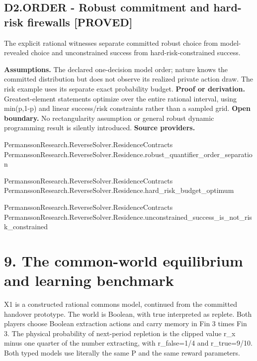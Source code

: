 \documentclass[11pt,a4paper]{article}
\begin{document}
\subsection*{D2.ORDER - Robust commitment and hard-risk firewalls [PROVED]}
The explicit rational witnesses separate committed robust choice from model-revealed choice and unconstrained success from hard-risk-constrained success.

\textbf{Assumptions.} The declared one-decision model order; nature knows the committed distribution but does not observe its realized private action draw. The risk example uses its separate exact probability budget.
\textbf{Proof or derivation.} Greatest-element statements optimize over the entire rational interval, using min(p,1-p) and linear success/risk constraints rather than a sampled grid.
\textbf{Open boundary.} No rectangularity assumption or general robust dynamic programming result is silently introduced.
\textbf{Source providers.}
{\footnotesize\raggedright PermanssonRe\allowbreak{}search.Rever\allowbreak{}seSolver.Res\allowbreak{}idenceContra\allowbreak{}cts\\ PermanssonRe\allowbreak{}search.Rever\allowbreak{}seSolver.Res\allowbreak{}idence.robus\allowbreak{}t\_quantifier\allowbreak{}\_order\_separ\allowbreak{}ation\par}
{\footnotesize\raggedright PermanssonRe\allowbreak{}search.Rever\allowbreak{}seSolver.Res\allowbreak{}idenceContra\allowbreak{}cts\\ PermanssonRe\allowbreak{}search.Rever\allowbreak{}seSolver.Res\allowbreak{}idence.hard\_\allowbreak{}risk\_budget\_\allowbreak{}optimum\par}
{\footnotesize\raggedright PermanssonRe\allowbreak{}search.Rever\allowbreak{}seSolver.Res\allowbreak{}idenceContra\allowbreak{}cts\\ PermanssonRe\allowbreak{}search.Rever\allowbreak{}seSolver.Res\allowbreak{}idence.uncon\allowbreak{}strained\_suc\allowbreak{}cess\_is\_not\_\allowbreak{}risk\_constra\allowbreak{}ined\par}
\section{9. The common-world equilibrium and learning benchmark}
X1 is a constructed rational commons model, continued from the committed handover prototype. The world is Boolean, with true interpreted as replete. Both players choose Boolean extraction actions and carry memory in Fin 3 times Fin 3. The physical probability of next-period repletion is the clipped value r\_x minus one quarter of the number extracting, with r\_false=1/4 and r\_true=9/10. Both typed models use literally the same P and the same reward parameters.
\end{document}
